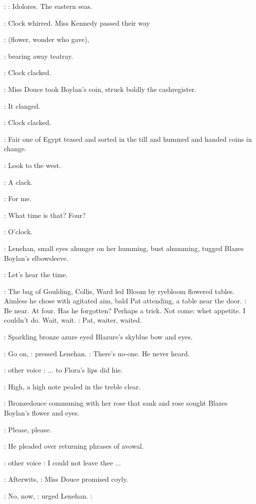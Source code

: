 \MissD:
\Song:
Idolores. The eastern seas.

:
Clock whirred.
Miss Kennedy passed their way

\BloomInt:
(flower, wonder who gave),

:
bearing away teatray.

:
Clock clacked.

:
Miss Douce took Boylan's coin, struck boldly the cashregister.

:
It clanged.

:
Clock clacked.

:
Fair one of Egypt teased and sorted in the till
and hummed and handed coins in change.

\BloomInt:
Look to the west.

:
A clack.

\BloomInt:
For me.

\boylan:
What time is that? Four?

:
O'clock.

:
Lenehan, small eyes ahunger on her humming, bust ahumming,
tugged Blazes Boylan's elbowsleeve.

\Lenehan:
Let's hear the time.


:
The bag of Goulding, Collis, Ward
led Bloom by ryebloom flowered
tables. Aimless he chose with agitated aim, bald Pat attending, a table
near the door.
\BloomInt:
Be near. At four. Has he forgotten? Perhaps a trick. Not
come: whet appetite. I couldn't do. Wait, wait.
:
Pat, waiter, waited.

:
Sparkling bronze azure eyed Blazure's skyblue bow and eyes.

\Lenehan:
Go on,
:
pressed Lenehan.
\Lenehan:
There's no-one. He never heard.

\Stage:
other voice
\Song:
... to Flora's lips did hie.

:
High, a high note pealed in the treble clear.

:
Bronzedouce communing with her rose that sank and rose sought
Blazes Boylan's flower and eyes.

\lenehan:
Please, please.

:
He pleaded over returning phrases of avowal.

\Stage:
other voice
\Song:
I could not leave thee ...

\MissD:
Afterwits,
:
Miss Douce promised coyly.

\Lenehan:
No, now,
:
urged Lenehan.
\Lenehan:


